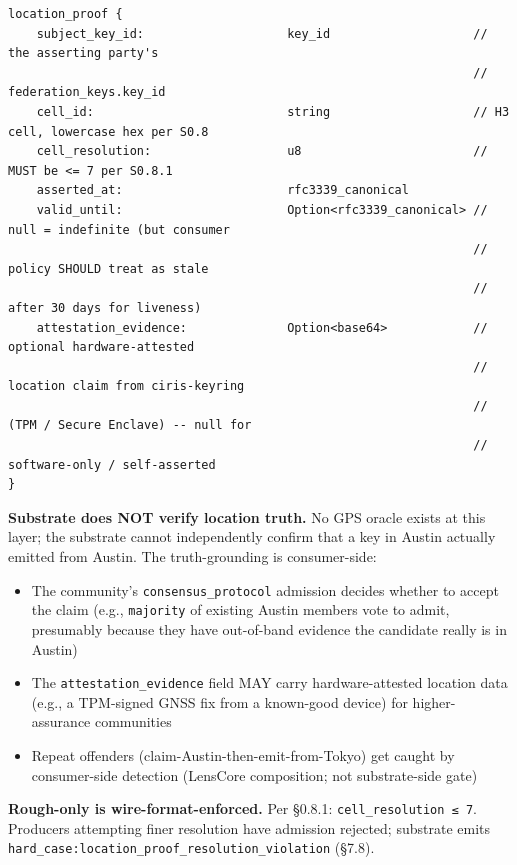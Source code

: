 \documentclass[11pt]{article}
\begin{document}
\begin{lstlisting}
location_proof {
    subject_key_id:                    key_id                    // the asserting party's
                                                                 //   federation_keys.key_id
    cell_id:                           string                    // H3 cell, lowercase hex per S0.8
    cell_resolution:                   u8                        // MUST be <= 7 per S0.8.1
    asserted_at:                       rfc3339_canonical
    valid_until:                       Option<rfc3339_canonical> // null = indefinite (but consumer
                                                                 //   policy SHOULD treat as stale
                                                                 //   after 30 days for liveness)
    attestation_evidence:              Option<base64>            // optional hardware-attested
                                                                 //   location claim from ciris-keyring
                                                                 //   (TPM / Secure Enclave) -- null for
                                                                 //   software-only / self-asserted
}
\end{lstlisting}

\textbf{Substrate does NOT verify location truth.} No GPS oracle exists at this layer; the substrate cannot independently confirm that a key in Austin actually emitted from Austin. The truth-grounding is consumer-side:


\begin{itemize}\setlength\itemsep{0pt}
\item The community's \texttt{consensus\_protocol} admission decides whether to accept the claim (e.g., \texttt{majority} of existing Austin members vote to admit, presumably because they have out-of-band evidence the candidate really is in Austin)
\item The \texttt{attestation\_evidence} field MAY carry hardware-attested location data (e.g., a TPM-signed GNSS fix from a known-good device) for higher-assurance communities
\item Repeat offenders (claim-Austin-then-emit-from-Tokyo) get caught by consumer-side detection (LensCore composition; not substrate-side gate)
\end{itemize}


\textbf{Rough-only is wire-format-enforced.} Per §0.8.1: \texttt{cell\_resolution ≤ 7}. Producers attempting finer resolution have admission rejected; substrate emits \texttt{hard\_case:location\_proof\_resolution\_violation} (§7.8).
\end{document}
